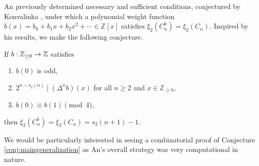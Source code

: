 An \cite{an2010combinatorial} previously determined necessary and sufficient conditions, conjectured by Konvalinka \cite{konvalinka2007divisibility}, under which a polynomial weight function $b(x)=b_0+b_1x+b_2x^2+\dotsb\in \mathbb{Z}[x]$ satisfies $\xi_2(C^b_n)=\xi_2(C_n)$. Inspired by his results, we make the following conjecture.
\begin{conjecture}
\label{conj:maingeneralization}
If $b: \mathbb{Z}_{\geq 0}\to\mathbb{Z}$ satisfies 
\begin{enumerate}
    \item $b(0)$ is odd,
    \item $2^{n-s_2(n)}\mid (\Delta^nb)(x)$ for all $n\geq 2$ and $x\in \mathbb{Z}_{\geq 0}$,
    \item $b(0)\equiv b(1)\pmod{4}$,
\end{enumerate}
then $\xi_2(C_n^b)=\xi_2(C_n)=s_2(n+1)-1.$
\end{conjecture}
We would be particularly interested in seeing a combinatorial proof of Conjecture \ref{conj:maingeneralization} as An's overall strategy was very computational in nature.